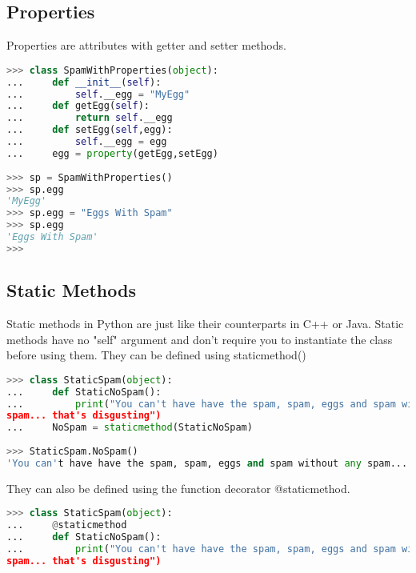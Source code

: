 \subsection{Properties}
Properties are attributes with getter and setter methods.
\lstset{basicstyle=\scriptsize, numbers=left, captionpos=b, tabsize=4}
\begin{lstlisting}[caption=Property Example,language={Python},
xleftmargin=15pt, label=lst:propertyexample]
>>> class SpamWithProperties(object):
...     def __init__(self):
...         self.__egg = "MyEgg"
...     def getEgg(self):
...         return self.__egg
...     def setEgg(self,egg):
...         self.__egg = egg
...     egg = property(getEgg,setEgg)
 
>>> sp = SpamWithProperties()
>>> sp.egg
'MyEgg'
>>> sp.egg = "Eggs With Spam"
>>> sp.egg
'Eggs With Spam'
>>>
\end{lstlisting}

\subsection{Static Methods}
Static methods in Python are just like their counterparts in C++ or Java. Static
methods have no "self" argument and don't require you to instantiate the class
before using them. They can be defined using staticmethod()
\lstset{basicstyle=\scriptsize, numbers=left, captionpos=b, tabsize=4}
\begin{lstlisting}[caption=Static Methode,language={Python},
xleftmargin=15pt, label=lst:staticmethode]
>>> class StaticSpam(object):
...     def StaticNoSpam():
...         print("You can't have have the spam, spam, eggs and spam without any
spam... that's disgusting")
...     NoSpam = staticmethod(StaticNoSpam)
 
>>> StaticSpam.NoSpam()
'You can't have have the spam, spam, eggs and spam without any spam... that's disgusting'
\end{lstlisting}

They can also be defined using the function decorator @staticmethod.
\lstset{basicstyle=\scriptsize, numbers=left, captionpos=b, tabsize=4}
\begin{lstlisting}[caption=Another Static Methode,language={Python},
xleftmargin=15pt, label=lst:anotherstaticmethode]
>>> class StaticSpam(object):
...     @staticmethod
...     def StaticNoSpam():
...         print("You can't have have the spam, spam, eggs and spam without any
spam... that's disgusting")
\end{lstlisting}


